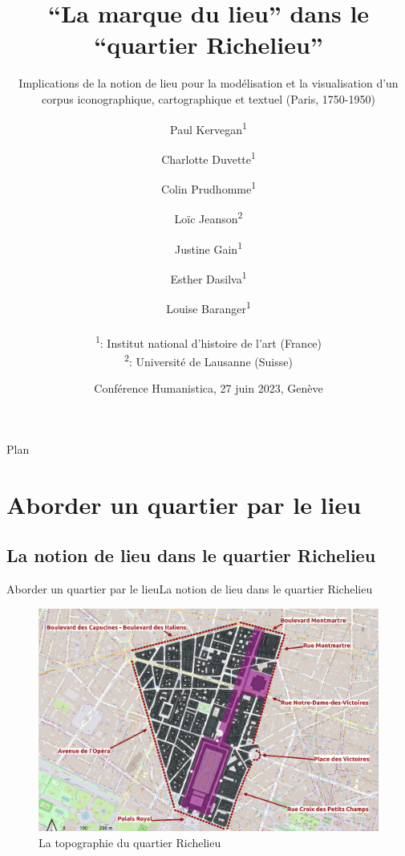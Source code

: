 \documentclass[8pt]{beamer}
\title[\enquote{La marque du lieu} dans le \enquote{quartier Richelieu}]{\enquote{La marque du lieu} dans le \enquote{quartier Richelieu}}
\subtitle{Implications de la notion de lieu pour la modélisation et la visualisation d'un corpus iconographique, cartographique et textuel (Paris, 1750-1950)}
\author[P. Kervegan, C. Duvette, C. Prudhomme, C. Jeanson \textit{et. al.}]{%
	Paul Kervegan\textsuperscript{1}
	\and Charlotte Duvette\textsuperscript{1}\\
	\and Colin Prudhomme\textsuperscript{1}
	\and Loïc Jeanson\textsuperscript{2}
	\and Justine Gain\textsuperscript{1}\\
	\and Esther Dasilva\textsuperscript{1}
	\and Louise Baranger\textsuperscript{1}
	\\~\\
	\textsuperscript{1}: Institut national d'histoire de l'art (France)\\
	\textsuperscript{2}: Université de Lausanne (Suisse)
}
\date{Conférence Humanistica, 27 juin 2023, Genève}
\begin{document}

\begin{frame}
	\titlepage
\end{frame}

\begin{frame}{Plan}
	\tableofcontents
\end{frame}

\section{Aborder un quartier par le lieu}
\subsection[La notion de lieu]{La notion de lieu dans le quartier Richelieu}
\begin{frame}{Aborder un quartier par le lieu}{La notion de lieu dans le quartier Richelieu}
	\begin{figure}[h]
		\centering
		\includegraphics[width=\textwidth]{includes/topographie.png}
		\caption{La topographie du quartier Richelieu}
	\end{figure}
\end{frame}
\end{document}
